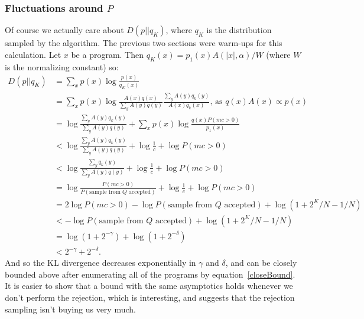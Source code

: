 \documentclass{article}
\begin{document}
\subsubsection{Fluctuations around $P$}
Of course we actually care about $D(p||q_K)$, where $q_K$ is the distribution sampled by the algorithm.
The previous two sections were warm-ups for this calculation.
Let $x$ be a program.
Then $q_K(x) = p_1(x)A(|x|,\alpha)/W$ (where $W$ is the normalizing constant)
so:
\begin{align}
  D(p||q_K)& = \sum_x p(x)\log \frac{p(x)}{q_K(x)}\\
  & = \sum_x p(x)\log \frac{A(x)q(x)}{\sum_y A(y)q(y)}\frac{\sum_y A(y)q_k(y)}{A(x)q_k(x)}\text{, as }q(x)A(x)\propto p(x)\\
  & = \log \frac{\sum_y A(y)q_k(y)}{\sum_y A(y)q(y)}+\sum_x p(x)\log \frac{q(x)P(mc > 0)}{p_1(x)}\\
  &  <  \log \frac{\sum_y A(y)q_k(y)}{\sum_y A(y)q(y)} + \log \frac{1}{c} + \log P(mc > 0)\\
  &  <    \log \frac{\sum_y q_k(y)}{\sum_y A(y)q(y)} + \log \frac{1}{c} + \log P(mc > 0)\\
  & = \log \frac{P(mc > 0)}{P(\text{sample from $Q$ accepted})}+ \log \frac{1}{c} + \log P(mc > 0)\\
  & = 2\log P(mc > 0) - \log P(\text{sample from $Q$ accepted})  + \log (1 + 2^K/N - 1/N)\label{closeBound}\\
  & < - \log P(\text{sample from $Q$ accepted})  + \log (1 + 2^K/N - 1/N)\\
  &  =  \log (1 + 2^{ - \gamma}) + \log (1 + 2^{ - \delta})\\
  & < 2^{ - \gamma} + 2^{ - \delta}.
\end{align}
And so the KL divergence decreases exponentially in $\gamma$ and $\delta$, and can be closely bounded above after enumerating all of the programs by equation~\ref{closeBound}.
It is easier to show that a bound with the same asymptotics holds whenever we don't perform the rejection,
which is interesting,
and suggests that the rejection sampling isn't buying us very much.
\end{document}
